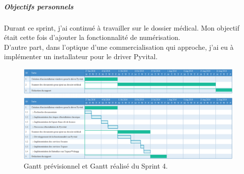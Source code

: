 \subparagraph{Objectifs personnels}
Durant ce sprint, j'ai continué à travailler sur le dossier médical. Mon objectif était cette fois d'ajouter la fonctionnalité de numérisation. \\
D'autre part, dans l'optique d'une commercialisation qui approche, j'ai eu à implémenter un installateur pour le driver Pyvital. 
\begin{figure}[H]
  \centering
  \centerline{\includegraphics[width=20.5cm]{./img/gantt_sprint4}}
  \caption{\label{fig:mb_va_ast} Gantt prévisionnel et Gantt réalisé du Sprint 4.}
\end{figure}

